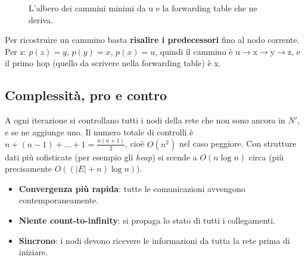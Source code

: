\begin{figure}[H]
\centering
{}
\caption{L'albero dei cammini minimi da u e la forwarding table che ne deriva.}
\end{figure}

Per ricostruire un cammino basta \textbf{risalire i predecessori} fino al nodo corrente. Per z: $p(z) = y$, $p(y) = x$, $p(x) = u$,
quindi il cammino è u$\rightarrow$x$\rightarrow$y$\rightarrow$z, e il primo hop (quello da scrivere nella forwarding table) è x.

\subsection{Complessità, pro e contro}

A ogni iterazione si controllano tutti i nodi della rete che non sono ancora in $N'$, e se ne aggiunge uno. Il numero totale di
controlli è $n + (n-1) + \dots + 1 = \frac{n(n+1)}{2}$, cioè $O(n^2)$ nel caso peggiore. Con strutture dati più sofisticate (per
esempio gli \emph{heap}) si scende a $O(n \log n)$ circa (più precisamente $O((|E| + n)\log n)$).

\begin{itemize}
    \item[\itick] \textbf{Convergenza più rapida}: tutte le comunicazioni avvengono contemporaneamente.
    \item[\itick] \textbf{Niente count-to-infinity}: si propaga lo stato di tutti i collegamenti.
    \item[\icross] \textbf{Sincrono}: i nodi devono ricevere le informazioni da tutta la rete prima di iniziare.
\end{itemize}

